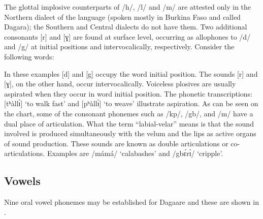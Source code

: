 The glottal implosive counterparts of /h/, /l/ and /m/ are attested only in the Northern dialect of the language (spoken mostly in Burkina Faso and called Dagara); the Southern and Central dialects do not have them. Two additional consonants [r] and [ɣ] are found at surface level, occurring as allophones to /d/ and /g/ at initial positions and intervocalically, respectively.
Consider the following words:



\z


In these examples [d] and [g] occupy the word initial position. The sounds [r] and [ɣ], on the other hand, occur intervocalically. Voiceless plosives are usually aspirated when they occur in word initial position. The phonetic transcriptions: [tʰàllɪ̀] ‘to walk fast’ and [pʰàllɪ̀] ‘to weave’ illustrate aspiration.
As can be seen on the chart, some of the consonant phonemes such as /kp/, /gb/, and /\ng m/ have
a dual place of articulation. \largerpage What the term ``labial-velar'' means is that the sound involved is produced simultaneously with the velum and the lips as active organs of sound production.  These sounds are known as double articulations or co-articulations. Examples are /\ng mámá/ ‘calabashes’ and /gbɛ́rɪ́/ ‘cripple’.

\subsection{Vowels}
Nine oral vowel phonemes may be established for Dagaare and these are shown in   .

